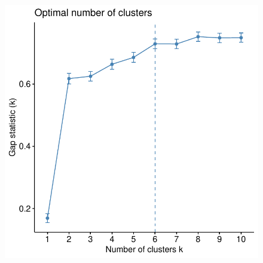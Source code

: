 \begin{outline}
%



\begin{figure}
    \centering
    \includegraphics[width=1.0\textwidth,page=1]{mainmatter/figures/chapter_04/plot_gene_set_enrichment.spline_fviz_nbclust_gap_stat.pdf}
    \caption{}
    \label{fig:multipants_dge_spline_fviz_nbclust_gap_stat}
\end{figure}


\end{outline}
